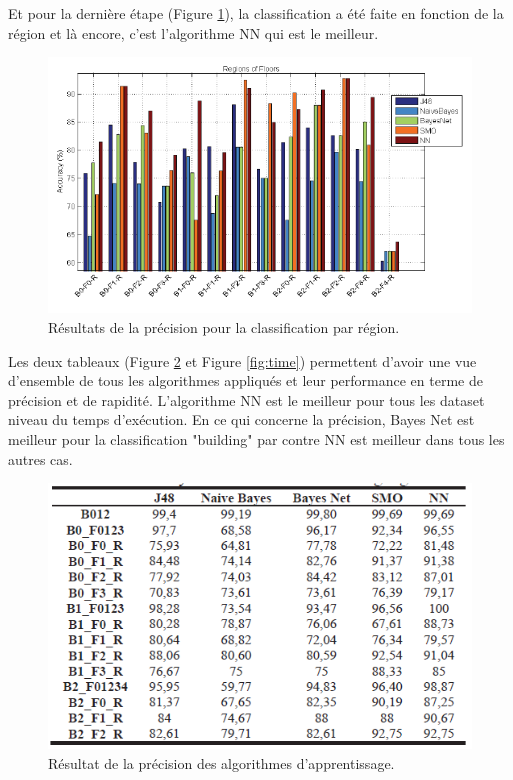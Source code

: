 Et pour la dernière étape (Figure \ref{fig:regionClass}), la classification a été faite en fonction de la région et là encore, c'est l'algorithme NN qui est le meilleur.

\begin{figure}[htp]
	\begin{center}
		\includegraphics[scale=0.6]{figures/regionClassification.png}
		\caption{Résultats de la précision pour la classification par région. \cite{ML_algo}}
		\label{fig:regionClass} %
	\end{center}
\end{figure}

Les deux tableaux (Figure \ref{fig:accuracy} et Figure \ref{fig:time}) permettent d'avoir une vue d'ensemble de tous les algorithmes appliqués et leur performance en terme de précision et de rapidité. L'algorithme NN est le meilleur pour tous les dataset niveau du temps d'exécution. En ce qui concerne la précision, Bayes Net est meilleur pour la classification "building" par contre NN est meilleur dans tous les autres cas.

\begin{figure}[htp]
	\begin{center}
		\includegraphics[scale=1]{figures/accuracy.png}
		\caption{Résultat de la précision des algorithmes d'apprentissage.\cite{ML_algo}}
		\label{fig:accuracy} %
	\end{center}
\end{figure}

